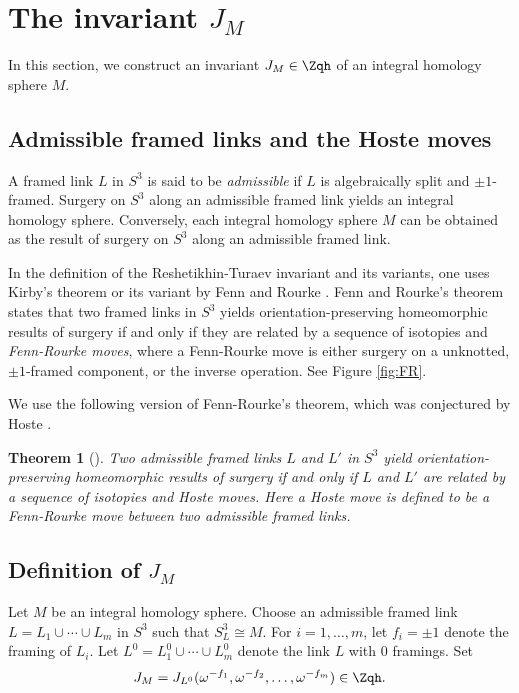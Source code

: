 \documentclass{amsart}
\numberwithin{equation}{section}
\numberwithin{figure}{section}
\theoremstyle{plain}
\newtheorem{theorem}{Theorem}[section]
\theoremstyle{definition}
\theoremstyle{remark}
\begin{document}
\section{The invariant $J_M$}
\label{sec10}

In this section, we construct an invariant $J_M\in \Zqh$ of an integral
homology sphere $M$.

\subsection{Admissible framed links and the Hoste moves}
\label{sec:hoste-moves}

A framed link $L$ in $S^3$ is said to be {\em admissible} if $L$ is
algebraically split and $\pm 1$-framed.  Surgery on $S^3$ along an
admissible framed link yields an integral homology sphere.
Conversely, each integral homology sphere $M$ can be obtained as the
result of surgery on $S^3$ along an admissible framed link.

In the definition of the Reshetikhin-Turaev invariant
\cite{Reshetikhin-Turaev:invariants} and its variants, one uses
Kirby's theorem \cite{Kirby} or its variant by Fenn and Rourke
\cite{Fenn-Rourke}.  Fenn and Rourke's theorem states that two framed
links in $S^3$ yields orientation-preserving homeomorphic results of
surgery if and only if they are related by a sequence of isotopies and
{\em Fenn-Rourke moves}, where a Fenn-Rourke move is either surgery on
a unknotted, $\pm 1$-framed component, or the inverse operation.  See
Figure \ref{fig:FR}.  

We use the following version of Fenn-Rourke's theorem, which was
conjectured by Hoste \cite{Hoste}.

\begin{theorem}[\cite{H:kirby1}]
  \label{r32}
  Two admissible framed links $L$ and $L'$ in $S^3$ yield
  orientation-preserving homeomorphic results of surgery if and only
  if $L$ and $L'$ are related by a sequence of isotopies and {\em
  Hoste moves}.  Here a Hoste move is defined to be a Fenn-Rourke move
  between two admissible framed links.
\end{theorem}

\subsection{Definition of $J_M$}
\label{sec:defin-unif-sl2}

Let $M$ be an integral homology sphere.  Choose an admissible framed
link $L=L_1\cup \cdots\cup L_m$ in $S^3$ such that $S^3_L\cong M$.  For
$i=1,\ldots,m$, let $f_i=\pm 1$ denote the framing of $L_i$.  Let
$L^0=L^0_1\cup \cdots\cup L^0_m$ denote the link $L$ with $0$ framings.  Set
\begin{equation}
  \label{eq:42}
  J_M= J_{L^0}(\omega ^{-f_1},\omega ^{-f_2},\ldots,\omega ^{-f_m})\in \Zqh.
\end{equation}
\end{document}
